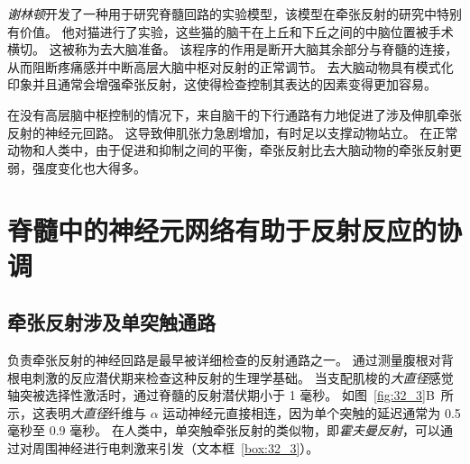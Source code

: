 \textit{谢林顿}开发了一种用于研究脊髓回路的实验模型，该模型在牵张反射的研究中特别有价值。
他对猫进行了实验，这些猫的脑干在上丘和下丘之间的中脑位置被手术横切。
这被称为去大脑准备。
该程序的作用是断开大脑其余部分与脊髓的连接，从而阻断疼痛感并中断高层大脑中枢对反射的正常调节。
去大脑动物具有模式化印象并且通常会增强牵张反射，这使得检查控制其表达的因素变得更加容易。


在没有高层脑中枢控制的情况下，来自脑干的下行通路有力地促进了涉及伸肌牵张反射的神经元回路。
这导致伸肌张力急剧增加，有时足以支撑动物站立。
在正常动物和人类中，由于促进和抑制之间的平衡，牵张反射比去大脑动物的牵张反射更弱，强度变化也大得多。



\section{脊髓中的神经元网络有助于反射反应的协调}

\subsection{牵张反射涉及单突触通路}

负责牵张反射的神经回路是最早被详细检查的反射通路之一。
通过测量腹根对背根电刺激的反应潜伏期来检查这种反射的生理学基础。
当支配肌梭的\textit{大直径}感觉轴突被选择性激活时，通过脊髓的反射潜伏期小于 1 毫秒。
如图~\ref{fig:32_3}B~所示，这表明\textit{大直径}纤维与 $ \alpha $ 运动神经元直接相连，因为单个突触的延迟通常为 0.5 毫秒至 0.9 毫秒。
在人类中，单突触牵张反射的类似物，即\textit{霍夫曼反射}，可以通过对周围神经进行电刺激来引发（文本框~\ref{box:32_3}）。


